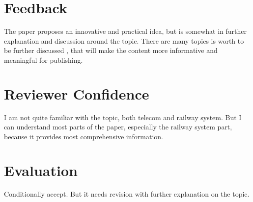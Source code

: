 \documentclass[a4paper,9pt]{scrartcl}
\begin{document}
\section{Feedback}
The paper proposes an innovative and practical idea, but is somewhat in further explanation and discussion around the topic. There are many topics is worth to be further discussed , that will make the content more informative and meaningful for publishing.

\section{Reviewer Confidence}
I am not quite familiar with the topic, both telecom and railway system. But I can understand most parts of the paper, especially the railway system part, because it provides most comprehensive information.

\section{Evaluation}
Conditionally accept. But it needs revision with further explanation on the topic.
\end{document}
